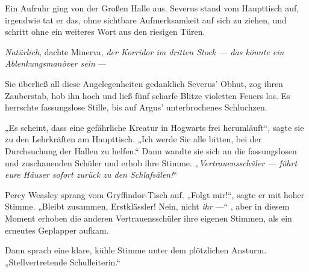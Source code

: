Ein Aufruhr ging von der Großen Halle aus. Severus stand vom Haupttisch auf, irgendwie tat er das, ohne sichtbare Aufmerksamkeit auf sich zu ziehen, und schritt ohne ein weiteres Wort aus den riesigen Türen.

\emph{Natürlich}, dachte Minerva, \emph{der Korridor im dritten Stock — das könnte ein Ablenkungsmanöver sein} —


Sie überließ all diese Angelegenheiten gedanklich Severus’ Obhut, zog ihren Zauberstab, hob ihn hoch und ließ fünf scharfe Blitze violetten Feuers los.
Es herrschte fassungslose Stille, bis auf Argus’ unterbrochenes Schluchzen.

„Es scheint, dass eine gefährliche Kreatur in Hogwarts frei herumläuft“, sagte sie zu den Lehrkräften am Haupttisch.
„Ich werde Sie alle bitten, bei der Durchsuchung der Hallen zu helfen.“ Dann wandte sie sich an die fassungslosen und zuschauenden Schüler und erhob ihre Stimme.
„\emph{Vertrauensschüler — führt eure Häuser sofort zurück zu den Schlafsälen!}“

Percy Weasley sprang vom Gryffindor-Tisch auf.
„Folgt mir!“, sagte er mit hoher Stimme.
„Bleibt zusammen, Erstklässler! Nein, nicht \emph{ihr} —“ , aber in diesem Moment erhoben die anderen Vertrauensschüler ihre eigenen Stimmen, als ein erneutes Geplapper aufkam.


Dann sprach eine klare, kühle Stimme unter dem plötzlichen Ansturm.
„Stellvertretende Schulleiterin.“

